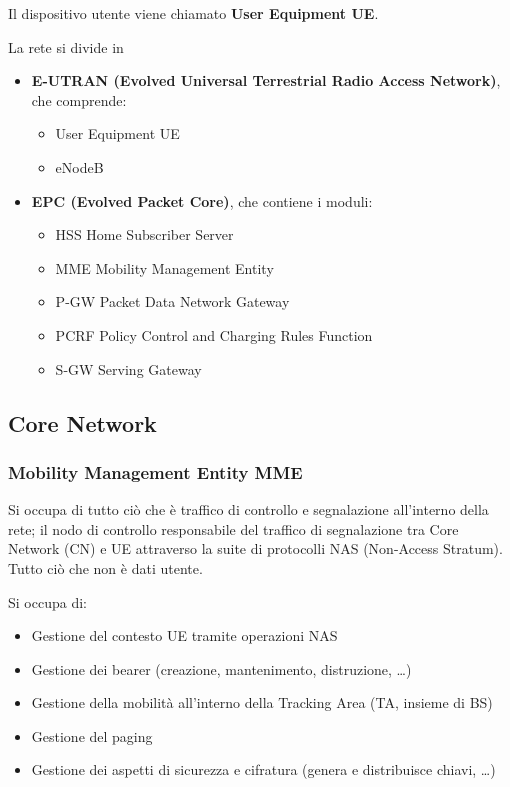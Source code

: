 Il dispositivo utente viene chiamato \textbf{User Equipment UE}.

La rete si divide in 
\begin{itemize}
	\item \textbf{E-UTRAN (Evolved Universal Terrestrial Radio Access Network)}, che comprende: 
	\begin{itemize}
		\item User Equipment UE
		
        \item eNodeB
	\end{itemize}
	
    \item \textbf{EPC (Evolved Packet Core)}, che contiene i moduli: 
	\begin{itemize}
		\item HSS Home Subscriber Server
	
    	\item MME Mobility Management Entity
	
    	\item P-GW Packet Data Network Gateway
	
    	\item PCRF Policy Control and Charging Rules Function
	
    	\item S-GW Serving Gateway
	\end{itemize}
\end{itemize}

\subsection{Core Network}

\subsubsection{Mobility Management Entity MME} 

Si occupa di tutto ciò che è traffico di controllo e segnalazione all'interno della rete; il nodo di controllo responsabile del traffico di segnalazione tra Core Network (CN) e UE attraverso la suite di protocolli NAS (Non-Access Stratum). Tutto ciò che non è dati utente. 

Si occupa di: 
\begin{itemize}
	\item Gestione del contesto UE tramite operazioni NAS

	\item Gestione dei bearer (creazione, mantenimento, distruzione, \dots)

	\item Gestione della mobilità all'interno della Tracking Area (TA, insieme di BS)

	\item Gestione del paging

	\item Gestione dei aspetti di sicurezza e cifratura (genera e distribuisce chiavi, \dots)
\end{itemize}

